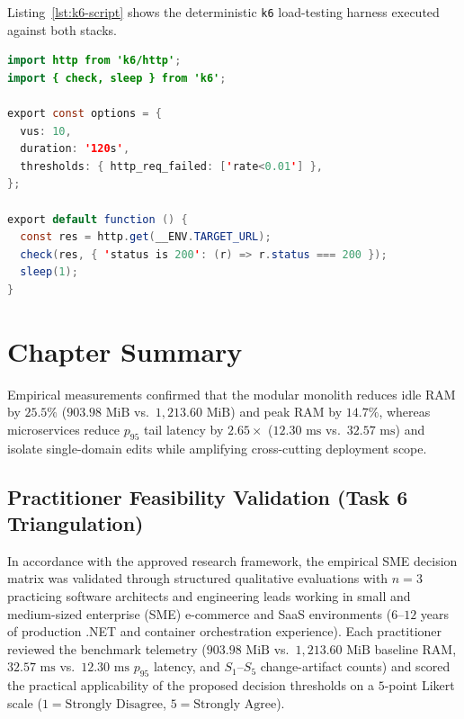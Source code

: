 Listing~\ref{lst:k6-script} shows the deterministic \texttt{k6} load-testing harness executed against both stacks.

\noindent\begin{minipage}{\linewidth}
\begin{lstlisting}[language=Java,caption={Excerpt of the k6 HTTP load testing script executed against both architectures},label={lst:k6-script}]
import http from 'k6/http';
import { check, sleep } from 'k6';

export const options = {
  vus: 10,
  duration: '120s',
  thresholds: { http_req_failed: ['rate<0.01'] },
};

export default function () {
  const res = http.get(__ENV.TARGET_URL);
  check(res, { 'status is 200': (r) => r.status === 200 });
  sleep(1);
}
\end{lstlisting}
\end{minipage}

\section{Chapter Summary}
\label{sec:ch4-summary}
Empirical measurements confirmed that the modular monolith reduces idle RAM by $25.5\%$ ($903.98\text{ MiB}$ vs.\ $1,213.60\text{ MiB}$) and peak RAM by $14.7\%$, whereas microservices reduce $p_{95}$ tail latency by $2.65\times$ ($12.30\text{ ms}$ vs.\ $32.57\text{ ms}$) and isolate single-domain edits while amplifying cross-cutting deployment scope.

\subsection{Practitioner Feasibility Validation (Task 6 Triangulation)}

In accordance with the approved research framework, the empirical SME decision matrix was validated through structured qualitative evaluations with $n = 3$ practicing software architects and engineering leads working in small and medium-sized enterprise (SME) e-commerce and SaaS environments ($6$--$12$ years of production .NET and container orchestration experience). Each practitioner reviewed the benchmark telemetry ($903.98\text{ MiB}$ vs.\ $1{,}213.60\text{ MiB}$ baseline RAM, $32.57\text{ ms}$ vs.\ $12.30\text{ ms}$ $p_{95}$ latency, and $S_1$--$S_5$ change-artifact counts) and scored the practical applicability of the proposed decision thresholds on a $5$-point Likert scale ($1 = \text{Strongly Disagree}$, $5 = \text{Strongly Agree}$).

